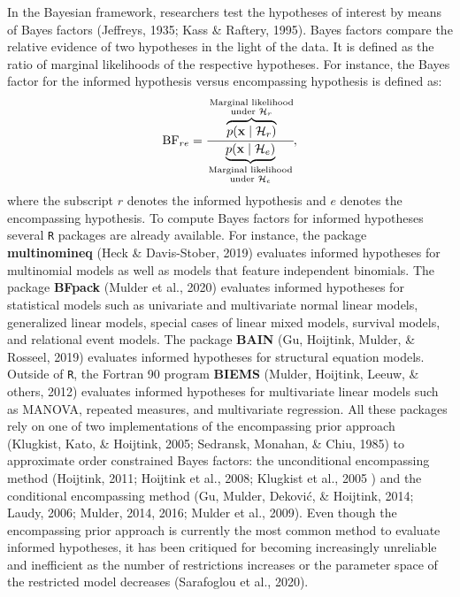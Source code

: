 \documentclass[
  english,
  man,floatsintext]{apa6}
\begin{document}
In the Bayesian framework, researchers test the hypotheses of interest by means of Bayes factors (Jeffreys, 1935; Kass \& Raftery, 1995). Bayes factors compare the relative evidence of two hypotheses in the light of the data. It is defined as the ratio of marginal likelihoods of the respective hypotheses. For instance, the Bayes factor for the informed hypothesis versus encompassing hypothesis is defined as:
\begin{align*}
\text{BF}_{re} = \cfrac{\overbrace{p(\mathbf{x}\mid \mathcal{H}_r)}^{\substack{\text{Marginal likelihood}\\\text{under $\mathcal{H}_r$}}}}{\underbrace{p(\mathbf{x}\mid \mathcal{H}_e)}_{\substack{\text{Marginal likelihood}\\\text{under $\mathcal{H}_e$}}}},
\end{align*}
where the subscript \(r\) denotes the informed hypothesis and \(e\) denotes the encompassing hypothesis. To compute Bayes factors for informed hypotheses several \texttt{R} packages are already available. For instance, the package \textbf{multinomineq} (Heck \& Davis-Stober, 2019) evaluates informed hypotheses for multinomial models as well as models that feature independent binomials. The package \textbf{BFpack} (Mulder et al., 2020) evaluates informed hypotheses for statistical models such as univariate and multivariate normal linear models, generalized linear models, special cases of linear mixed models, survival models, and relational event models. The package \textbf{BAIN} (Gu, Hoijtink, Mulder, \& Rosseel, 2019) evaluates informed hypotheses for structural equation models. Outside of \texttt{R}, the Fortran 90 program \textbf{BIEMS} (Mulder, Hoijtink, Leeuw, \& others, 2012) evaluates informed hypotheses for multivariate linear models such as MANOVA, repeated measures, and multivariate regression. All these packages rely on one of two implementations of the encompassing prior approach (Klugkist, Kato, \& Hoijtink, 2005; Sedransk, Monahan, \& Chiu, 1985) to approximate order constrained Bayes factors: the unconditional encompassing method (Hoijtink, 2011; Hoijtink et al., 2008; Klugkist et al., 2005 ) and the conditional encompassing method (Gu, Mulder, Deković, \& Hoijtink, 2014; Laudy, 2006; Mulder, 2014, 2016; Mulder et al., 2009). Even though the encompassing prior approach is currently the most common method to evaluate informed hypotheses, it has been critiqued for becoming increasingly unreliable and inefficient as the number of restrictions increases or the parameter space of the restricted model decreases (Sarafoglou et al., 2020).
\end{document}
